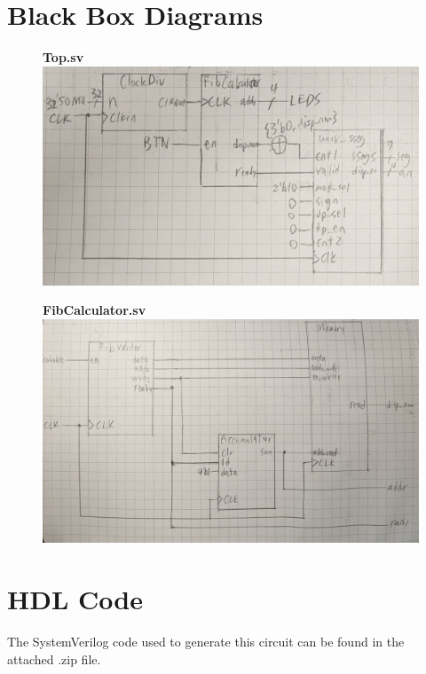 \documentclass{article}
\begin{document}
\section{Black Box Diagrams}

\begin{figure}[H]
    \centering
    \textbf{Top.sv}
    \includegraphics[width=\linewidth]{top.jpg}
\end{figure}

\begin{figure}[H]
    \centering
    \textbf{FibCalculator.sv}
    \includegraphics[width=\linewidth]{fibcalc.jpg}
\end{figure}

\section{HDL Code}

The SystemVerilog code used to generate this circuit can be found in the 
attached .zip file.
\end{document}

